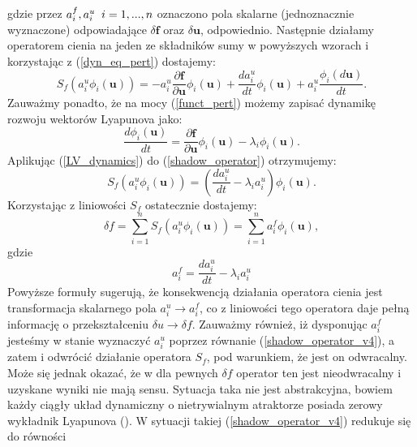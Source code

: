 \documentclass[12pt]{article}
\begin{document}
gdzie przez $ a^{f}_{i},a^{u}_{i} \thickspace \thickspace i=1,...,n$ oznaczono pola skalarne (jednoznacznie wyznaczone) odpowiadające $ \delta \textbf{f}  $ oraz $ \delta \textbf{u}  $, odpowiednio. Następnie działamy operatorem cienia na jeden ze składników sumy w powyższych wzorach i korzystając z (\ref{dyn_eq_pert}) dostajemy:
\begin{equation}
S_{f}(a^{u}_{i}\phi_{i}(\textbf{u})) = -a^{u}_{i}\frac{\partial{\textbf{f}}}{\partial{\textbf{u}}} \phi_{i}(\textbf{u}) + \frac{da^{u}_{i}}{dt}\phi_{i}(\textbf{u}) + a^{u}_{i}\frac{\phi_{i}(d\textbf{u})}{dt}.
\label{shadow_operator}
\end{equation}
Zauważmy ponadto, że na mocy (\ref{funct_pert}) możemy zapisać dynamikę rozwoju wektorów Lyapunova jako:
\begin{equation}
\frac{d\phi_{i}(\textbf{u})}{dt} = \frac{\partial{\textbf{f}}}{\partial{\textbf{u}}}\phi_{i}(\textbf{u}) - \lambda_{i}\phi_{i}(\textbf{u}).
\label{LV_dynamics}
\end{equation}
Aplikując (\ref{LV_dynamics}) do (\ref{shadow_operator}) otrzymujemy:
\begin{equation}
S_{f}(a^{u}_{i}\phi_{i}(\textbf{u})) = (\frac{da^{u}_{i}}{dt} - \lambda_{i}a^{u}_{i})\phi_{i}(\textbf{u}).
\label{shadow_operator_v2}
\end{equation}
Korzystając z liniowości $ S_{f} $ ostatecznie dostajemy:
\begin{equation}
\delta f = \sum_{i=1}^{n}S_{f}(a^{u}_{i}\phi_{i}(\textbf{u})) = \sum_{i=1}^{n}a^{f}_{i}\phi_{i}(\textbf{u}),
\label{shadow_operator_v3}
\end{equation}
gdzie 
\begin{equation}
a^{f}_{i} = \frac{da^{u}_{i}}{dt} - \lambda_{i}a^{u}_{i}
\label{shadow_operator_v4}
\end{equation}
Powyższe formuły sugerują, że konsekwencją działania operatora cienia jest transformacja skalarnego pola $ a^{u}_{i} \rightarrow a^{f}_{i} $, co z liniowości tego operatora daje pełną informację o przekształceniu $ \delta u \rightarrow \delta f $. Zauważmy również, iż dysponując $ a^{f}_{i} $ jesteśmy w stanie wyznaczyć $ a^{u}_{i} $ poprzez równanie (\ref{shadow_operator_v4}), a zatem i odwrócić działanie operatora $ S_{f} $, pod warunkiem, że jest on odwracalny. Może się jednak okazać, że w dla pewnych $ \delta f $ operator ten jest nieodwracalny i uzyskane wyniki nie mają sensu. Sytuacja taka nie jest abstrakcyjna, bowiem każdy ciągły układ dynamiczny o nietrywialnym atraktorze posiada zerowy wykładnik Lyapunova (\cite{Qiqi1}). W sytuacji takiej (\ref{shadow_operator_v4}) redukuje się do równości
\end{document}
